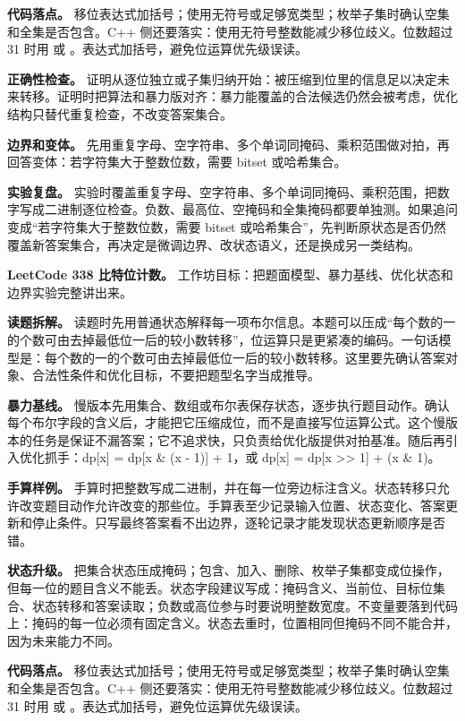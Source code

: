 \textbf{代码落点。} 移位表达式加括号；使用无符号或足够宽类型；枚举子集时确认空集和全集是否包含。C++ 侧还要落实：使用无符号整数能减少移位歧义。位数超过 31 时用  或 。表达式加括号，避免位运算优先级误读。

\textbf{正确性检查。} 证明从逐位独立或子集归纳开始：被压缩到位里的信息足以决定未来转移。证明时把算法和暴力版对齐：暴力能覆盖的合法候选仍然会被考虑，优化结构只替代重复检查，不改变答案集合。

\textbf{边界和变体。} 先用重复字母、空字符串、多个单词同掩码、乘积范围做对拍，再回答变体：若字符集大于整数位数，需要 bitset 或哈希集合。

\textbf{实验复盘。} 实验时覆盖重复字母、空字符串、多个单词同掩码、乘积范围，把数字写成二进制逐位检查。负数、最高位、空掩码和全集掩码都要单独测。如果追问变成“若字符集大于整数位数，需要 bitset 或哈希集合”，先判断原状态是否仍然覆盖新答案集合，再决定是微调边界、改状态语义，还是换成另一类结构。

\noindent\textbf{LeetCode 338 比特位计数。} 工作坊目标：把题面模型、暴力基线、优化状态和边界实验完整讲出来。

\textbf{读题拆解。} 读题时先用普通状态解释每一项布尔信息。本题可以压成“每个数的一的个数可由去掉最低位一后的较小数转移”，位运算只是更紧凑的编码。一句话模型是：每个数的一的个数可由去掉最低位一后的较小数转移。这里要先确认答案对象、合法性条件和优化目标，不要把题型名字当成推导。

\textbf{暴力基线。} 慢版本先用集合、数组或布尔表保存状态，逐步执行题目动作。确认每个布尔字段的含义后，才能把它压缩成位，而不是直接写位运算公式。这个慢版本的任务是保证不漏答案；它不追求快，只负责给优化版提供对拍基准。随后再引入优化抓手：dp[x] = dp[x \& (x - 1)] + 1，或 dp[x] = dp[x >> 1] + (x \& 1)。

\textbf{手算样例。} 手算时把整数写成二进制，并在每一位旁边标注含义。状态转移只允许改变题目动作允许改变的那些位。手算表至少记录输入位置、状态变化、答案更新和停止条件。只写最终答案看不出边界，逐轮记录才能发现状态更新顺序是否错。

\textbf{状态升级。} 把集合状态压成掩码；包含、加入、删除、枚举子集都变成位操作，但每一位的题目含义不能丢。状态字段建议写成：掩码含义、当前位、目标位集合、状态转移和答案读取；负数或高位参与时要说明整数宽度。不变量要落到代码上：掩码的每一位必须有固定含义。状态去重时，位置相同但掩码不同不能合并，因为未来能力不同。

\textbf{代码落点。} 移位表达式加括号；使用无符号或足够宽类型；枚举子集时确认空集和全集是否包含。C++ 侧还要落实：使用无符号整数能减少移位歧义。位数超过 31 时用  或 。表达式加括号，避免位运算优先级误读。

